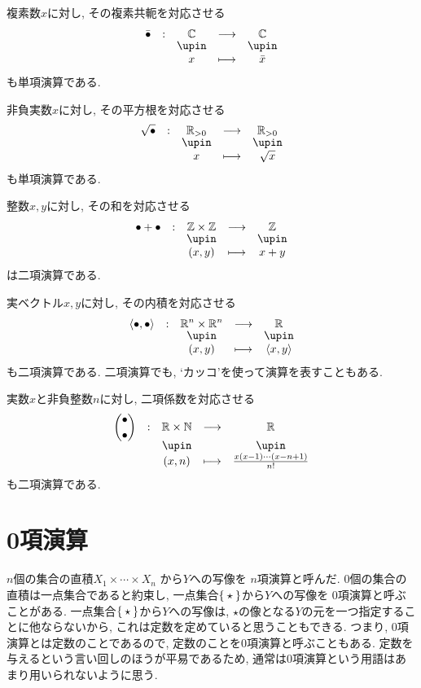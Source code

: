 \begin{example}
  複素数$x$に対し, その複素共軛を対応させる
  \begin{align*}
    \shazo{\bar\tofu }
          {\CC}{\CC}
          {x}{\bar{x}}
  \end{align*}
  も単項演算である.
\end{example}
\begin{example}
  非負実数$x$に対し, その平方根を対応させる
  \begin{align*}
    \shazo{\sqrt\tofu }
          {\RR_{>0}}{\RR_{>0}}
          {x}{\sqrt{x}}
  \end{align*}
  も単項演算である.
\end{example}


\begin{example}
  整数$x,y$に対し, その和を対応させる
  \begin{align*}
    \shazo{\tofu+\tofu}
          {\ZZ\times \ZZ}{\ZZ}
          {(x,y)}{x+y}
  \end{align*}
  は二項演算である.
\end{example}
\begin{example}
  実ベクトル$x,y$に対し, その内積を対応させる
  \begin{align*}
    \shazo{\Braket{\tofu,\tofu}}
          {\RR^n\times \RR^n}{\RR}
          {(x,y)}{\Braket{x,y}}
  \end{align*}
  も二項演算である.
  二項演算でも, `カッコ'を使って演算を表すこともある.
\end{example}

\begin{example}
  実数$x$と非負整数$n$に対し,
  二項係数を対応させる
  \begin{align*}
    \shazo{\binom{\tofu}{\tofu}}
          {\RR\times \NN}{\RR}
          {(x,n)}{\frac{x(x-1)\cdots(x-n+1)}{n!}}
  \end{align*}
  も二項演算である.
\end{example}


\section{0項演算}
$n$個の集合の直積$X_1\times \cdots \times X_n$
から$Y$への写像を
$n$項演算と呼んだ.
$0$個の集合の直積は一点集合であると約束し,
一点集合$\Set{\star}$から$Y$への写像を
$0$項演算と呼ぶことがある.
一点集合$\Set{\star}$から$Y$への写像は,
$\star$の像となる$Y$の元を一つ指定することに他ならないから,
これは定数を定めていると思うこともできる.
つまり, $0$項演算とは定数のことであるので,
定数のことを$0$項演算と呼ぶこともある.
定数を与えるという言い回しのほうが平易であるため,
通常は$0$項演算という用語はあまり用いられないように思う.

